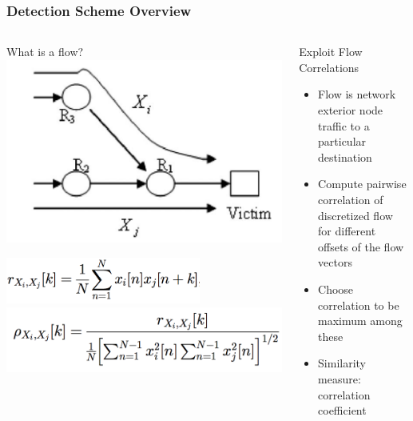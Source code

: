 \documentclass[10pt,mathserif]{beamer}
\begin{document}
\begin{frame}
  \frametitle{Detection Scheme Overview}
  \begin{columns}[T]
    \begin{column}{0.5\textwidth}
      \begin{block}{What is a flow?}
        \includegraphics[width=\textwidth,natwidth=714,natheight=472]{figures/flow.png}
      \end{block}
      \vspace{-0.2cm}
      \begin{center}
      \includegraphics[width=0.7\textwidth,natwidth=558,natheight=140]{figures/correlation_def.png}
      \vspace{-0.01cm}
      \includegraphics[width=\textwidth,natwidth=798,natheight=188]{figures/correlation_coeff_def.png}
    \end{center}
    \end{column}
    \begin{column}{0.5\textwidth}
      \begin{block}{Exploit Flow Correlations}
        \begin{itemize}
          \item Flow is network exterior node traffic to a particular
            destination
          \item Compute pairwise correlation of discretized flow for
            different offsets of the flow vectors
          \item Choose correlation to be maximum among these
          \item Similarity measure: correlation coefficient
        \end{itemize}
      \end{block}


\end{column}
\end{columns}
\end{frame}
\end{document}
